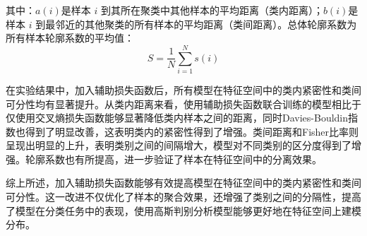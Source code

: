 其中：$a(i)$是样本 $i$ 到其所在聚类中其他样本的平均距离（类内距离）；$b(i)$是样本 $i$ 到最邻近的其他聚类的所有样本的平均距离（类间距离）。总体轮廓系数为所有样本轮廓系数的平均值：
\[
S = \frac{1}{N} \sum_{i=1}^N s(i)
\]


\begin{table}[H]
\captionsetup{font=small, justification=centering}
\centering
\renewcommand{\arraystretch}{1.2} %
\setlength{\tabcolsep}{6pt} %
\caption{对比加入辅助损失函数前后特征空间类内紧密性和类间可分性的变化}
\label{feature_analysis}
\end{table}

在实验结果中，加入辅助损失函数后，所有模型在特征空间中的类内紧密性和类间可分性均有显著提升。从类内距离来看，使用辅助损失函数联合训练的模型相比于仅使用交叉熵损失函数能够显著降低类内样本之间的距离，同时Davies-Bouldin指数也得到了明显改善，这表明类内的紧密性得到了增强。类间距离和Fisher比率则呈现出明显的上升，表明类别之间的间隔增大，模型对不同类别的区分度得到了增强。轮廓系数也有所提高，进一步验证了样本在特征空间中的分离效果。

综上所述，加入辅助损失函数能够有效提高模型在特征空间中的类内紧密性和类间可分性。这一改进不仅优化了样本的聚合效果，还增强了类别之间的分隔性，提高了模型在分类任务中的表现，使用高斯判别分析模型能够更好地在特征空间上建模分布。



